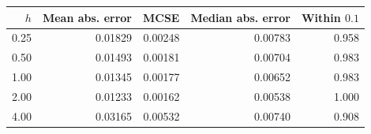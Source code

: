 \begin{tabular}{@{}rrrrr@{}}
\toprule
$h$ & Mean abs. error & MCSE & Median abs. error & Within $0.1$ \\
\midrule
0.25 & 0.01829 & 0.00248 & 0.00783 & 0.958 \\
0.50 & 0.01493 & 0.00181 & 0.00704 & 0.983 \\
1.00 & 0.01345 & 0.00177 & 0.00652 & 0.983 \\
2.00 & 0.01233 & 0.00162 & 0.00538 & 1.000 \\
4.00 & 0.03165 & 0.00532 & 0.00740 & 0.908 \\
\bottomrule
\end{tabular}
